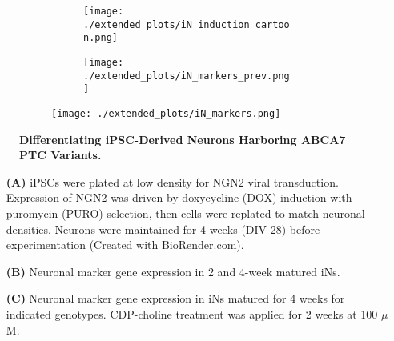 \begin{figure}[H]
    \begin{subfigure}[t]{\textwidth}
        \begin{subfigure}[t]{0.45\textwidth}
            \caption{}
            \texttt{[image: ./extended\_plots/iN\_induction\_cartoon.png]}        
        \end{subfigure}
        \begin{subfigure}[t]{0.45\textwidth}
            \caption{}
            \texttt{[image: ./extended\_plots/iN\_markers\_prev.png]}        
        \end{subfigure}
    \end{subfigure}
    \begin{subfigure}[t]{0.8\textwidth}
        \caption{}
        \hspace{2cm}
        \texttt{[image: ./extended\_plots/iN\_markers.png]}        
    \end{subfigure}
    \caption{
        \textbf{Differentiating iPSC-Derived Neurons Harboring ABCA7 PTC Variants.}\\
    }
    \label{fig:iN_markers}
\end{figure}
\begin{itemize}
    \item[\textbf{(A)}] iPSCs were plated at low density for NGN2 viral transduction. Expression of NGN2 was driven by doxycycline (DOX) induction with puromycin (PURO) selection, then cells were replated to match neuronal densities. Neurons were maintained for 4 weeks (DIV 28) before experimentation (Created with BioRender.com). 
    \item[\textbf{(B)}] Neuronal marker gene expression in 2 and 4-week matured iNs. 
    \item[\textbf{(C)}] Neuronal marker gene expression in iNs matured for 4 weeks for indicated genotypes. CDP-choline treatment was applied for 2 weeks at 100 $\mu$M.
\end{itemize}